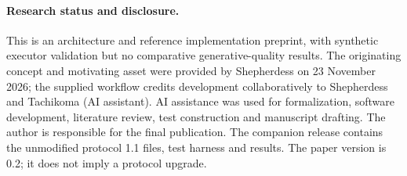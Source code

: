\documentclass[10pt,twocolumn]{article}
\begin{document}
\paragraph{Research status and disclosure.} This is an architecture and reference implementation preprint, with synthetic executor validation but no comparative generative-quality results. The originating concept and motivating asset were provided by Shepherdess on 23 November 2026; the supplied workflow credits development collaboratively to Shepherdess and Tachikoma (AI assistant). AI assistance was used for formalization, software development, literature review, test construction and manuscript drafting. The author is responsible for the final publication. The companion release contains the unmodified protocol 1.1 files, test harness and results. The paper version is 0.2; it does not imply a protocol upgrade.
\end{document}
